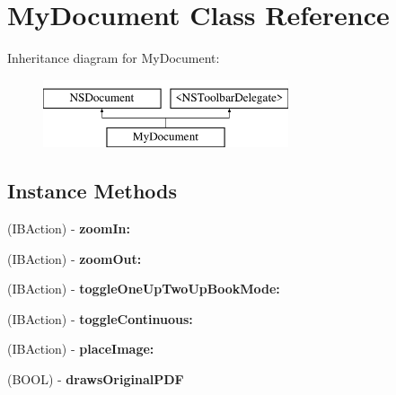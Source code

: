 \hypertarget{interface_my_document}{}\section{My\+Document Class Reference}
\label{interface_my_document}
Inheritance diagram for My\+Document\+:\begin{figure}[H]
\begin{center}
\leavevmode
\includegraphics[height=2.000000cm]{interface_my_document}
\end{center}
\end{figure}
\subsection*{Instance Methods}
\begin{DoxyCompactItemize}
\item 
\mbox{\label{interface_my_document_a9a20a70cb8e023808c540d0abeb91302}} 
(I\+B\+Action) -\/ {\bfseries zoom\+In\+:}
\item 
\mbox{\label{interface_my_document_a496bf237ee0de6659e84aa80e07328d2}} 
(I\+B\+Action) -\/ {\bfseries zoom\+Out\+:}
\item 
\mbox{\label{interface_my_document_ae1d77f8f431ffafe65335f1036801d65}} 
(I\+B\+Action) -\/ {\bfseries toggle\+One\+Up\+Two\+Up\+Book\+Mode\+:}
\item 
\mbox{\label{interface_my_document_a818819c43b6b55fac78a28dcbbb7742d}} 
(I\+B\+Action) -\/ {\bfseries toggle\+Continuous\+:}
\item 
\mbox{\label{interface_my_document_a59451ad57709e8da99d7359fd90ada53}} 
(I\+B\+Action) -\/ {\bfseries place\+Image\+:}
\item 
\mbox{\label{interface_my_document_a723263cbc3c651ffff959b675c4a264c}} 
(B\+O\+OL) -\/ {\bfseries draws\+Original\+P\+DF}
\end{DoxyCompactItemize}
